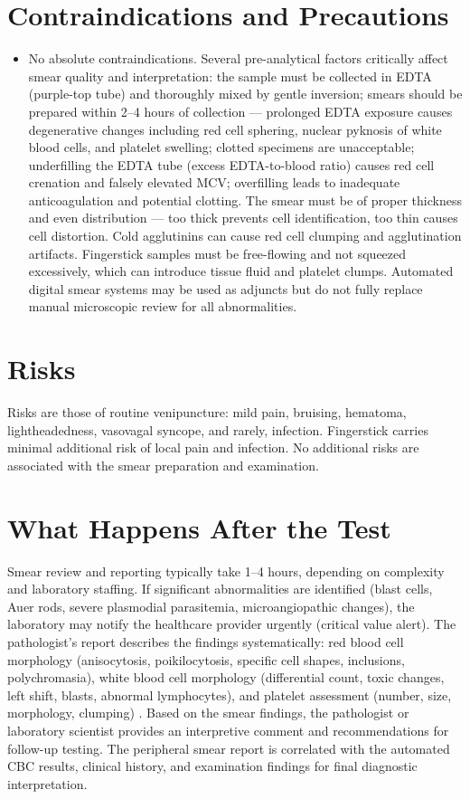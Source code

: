 \section*{Contraindications and Precautions}
\begin{itemize}
  \item No absolute contraindications. Several pre-analytical factors critically affect smear quality and interpretation: the sample must be collected in EDTA (purple-top tube) and thoroughly mixed by gentle inversion; smears should be prepared within 2--4 hours of collection --- prolonged EDTA exposure causes degenerative changes including red cell sphering, nuclear pyknosis of white blood cells, and platelet swelling; clotted specimens are unacceptable; underfilling the EDTA tube (excess EDTA-to-blood ratio) causes red cell crenation and falsely elevated MCV; overfilling leads to inadequate anticoagulation and potential clotting. The smear must be of proper thickness and even distribution --- too thick prevents cell identification, too thin causes cell distortion. Cold agglutinins can cause red cell clumping and agglutination artifacts. Fingerstick samples must be free-flowing and not squeezed excessively, which can introduce tissue fluid and platelet clumps. Automated digital smear systems may be used as adjuncts but do not fully replace manual microscopic review for all abnormalities.
\end{itemize}
\section*{Risks}
Risks are those of routine venipuncture: mild pain, bruising, hematoma, lightheadedness, vasovagal syncope, and rarely, infection. Fingerstick carries minimal additional risk of local pain and infection. No additional risks are associated with the smear preparation and examination.

\section*{What Happens After the Test}
Smear review and reporting typically take 1--4 hours, depending on complexity and laboratory staffing. If significant abnormalities are identified (blast cells, Auer rods, severe plasmodial parasitemia, microangiopathic changes), the laboratory may notify the healthcare provider urgently (critical value alert). The pathologist's report describes the findings systematically: red blood cell morphology (anisocytosis, poikilocytosis, specific cell shapes, inclusions, polychromasia), white blood cell morphology (differential count, toxic changes, left shift, blasts, abnormal lymphocytes), and platelet assessment (number, size, morphology, clumping) \cite{palmer2015icsh}. Based on the smear findings, the pathologist or laboratory scientist provides an interpretive comment and recommendations for follow-up testing. The peripheral smear report is correlated with the automated CBC results, clinical history, and examination findings for final diagnostic interpretation.

